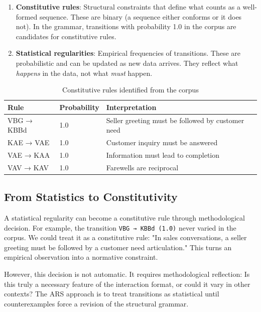 \documentclass[12pt,a4paper]{article}
\begin{document}
\begin{enumerate}
    \item \textbf{Constitutive rules}: Structural constraints that define
    what counts as a well-formed sequence. These are binary (a sequence either
    conforms or it does not). In the grammar, transitions with probability
    1.0 in the corpus are candidates for constitutive rules.
    
    \item \textbf{Statistical regularities}: Empirical frequencies of
    transitions. These are probabilistic and can be updated as new data
    arrives. They reflect what \textit{happens} in the data, not what
    \textit{must} happen.
\end{enumerate}

\begin{table}[H]
\centering
\caption{Constitutive rules identified from the corpus}
\label{tab:constitutive}
\begin{tabular}{@{} l l l @{}}
\toprule
\textbf{Rule} & \textbf{Probability} & \textbf{Interpretation} \\
\midrule
VBG → KBBd & 1.0 & Seller greeting must be followed by customer need \\
KAE → VAE & 1.0 & Customer inquiry must be answered \\
VAE → KAA & 1.0 & Information must lead to completion \\
VAV → KAV & 1.0 & Farewells are reciprocal \\
\bottomrule
\end{tabular}
\end{table}

\subsection{From Statistics to Constitutivity}

A statistical regularity can become a constitutive rule through methodological
decision. For example, the transition \texttt{VBG → KBBd (1.0)} never varied
in the corpus. We could treat it as a constitutive rule: "In sales conversations,
a seller greeting must be followed by a customer need articulation." This
turns an empirical observation into a normative constraint.

However, this decision is not automatic. It requires methodological reflection:
Is this truly a necessary feature of the interaction format, or could it vary
in other contexts? The ARS approach is to treat transitions as statistical
until counterexamples force a revision of the structural grammar.
\end{document}
